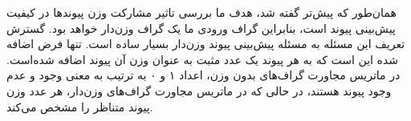 همان‌طور که پیش‌تر گفته شد، هدف ما بررسی تاثیر مشارکت وزن پیوندها در کیفیت پیش‌بینی پیوند است، بنابراین گراف ورودی ما یک گراف وزن‌دار خواهد بود. گسترش تعریف این مسئله به مسئله پیش‌بینی پیوند وزن‌دار بسیار ساده است. تنها فرض اضافه شده این است که به هر پیوند یک عدد مثبت به عنوان وزن آن پیوند اضافه شده‌است. در ماتریس مجاورت گراف‌های بدون وزن، اعداد ۱ و ۰ به ترتیب به معنی وجود و عدم وجود پیوند هستند، در حالی که در ماتریس مجاورت گراف‌های وزن‌دار، هر عدد وزن پیوند متناظر را مشخص می‌کند.





